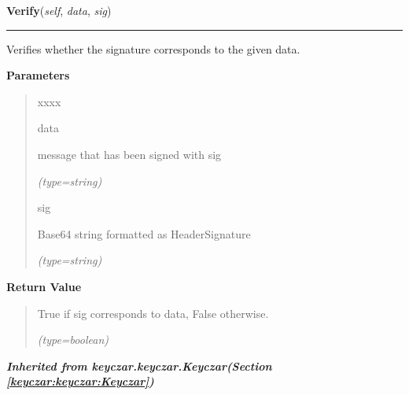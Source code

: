     \label{keyczar:keyczar:Verifier:Verify}

    \vspace{0.5ex}

\hspace{.8\funcindent}\begin{boxedminipage}{\funcwidth}

    \raggedright \textbf{Verify}(\textit{self}, \textit{data}, \textit{sig})

    \vspace{-1.5ex}

    \rule{\textwidth}{0.5\fboxrule}
\setlength{\parskip}{2ex}
    Verifies whether the signature corresponds to the given data.

\setlength{\parskip}{1ex}
      \textbf{Parameters}
      \vspace{-1ex}

      \begin{quote}
        \begin{Ventry}{xxxx}

          \item[data]

          message that has been signed with sig

            {\it (type=string)}

          \item[sig]

          Base64 string formatted as Header{\textbar}Signature

            {\it (type=string)}

        \end{Ventry}

      \end{quote}

      \textbf{Return Value}
    \vspace{-1ex}

      \begin{quote}
      True if sig corresponds to data, False otherwise.

      {\it (type=boolean)}

      \end{quote}

    \end{boxedminipage}


\large{\textbf{\textit{Inherited from keyczar.keyczar.Keyczar\textit{(Section \ref{keyczar:keyczar:Keyczar})}}}}

